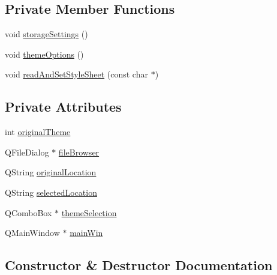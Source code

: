 \subsection*{Private Member Functions}
\begin{DoxyCompactItemize}
\item 
void \hyperlink{class_do_lah_1_1_settings_window_a198b5a222c1a612121988d86488008ba}{storage\+Settings} ()
\item 
void \hyperlink{class_do_lah_1_1_settings_window_af281a467be9f99d29e891904bd1fc239}{theme\+Options} ()
\item 
void \hyperlink{class_do_lah_1_1_settings_window_a190379578f80679445d34c3c90ce1614}{read\+And\+Set\+Style\+Sheet} (const char $\ast$)
\end{DoxyCompactItemize}
\subsection*{Private Attributes}
\begin{DoxyCompactItemize}
\item 
int \hyperlink{class_do_lah_1_1_settings_window_a923bacea5c3d17109ff6bfc0cbbaf58f}{original\+Theme}
\item 
Q\+File\+Dialog $\ast$ \hyperlink{class_do_lah_1_1_settings_window_a08d4040836467574e3ffbe85bdd3272d}{file\+Browser}
\item 
Q\+String \hyperlink{class_do_lah_1_1_settings_window_a1dcf2106d2e26c89f569e571a8fece38}{original\+Location}
\item 
Q\+String \hyperlink{class_do_lah_1_1_settings_window_a0c26a7b802888f80bf382a5f3245a1f6}{selected\+Location}
\item 
Q\+Combo\+Box $\ast$ \hyperlink{class_do_lah_1_1_settings_window_a6a18dc1bafd9e46b696584dbba064db5}{theme\+Selection}
\item 
Q\+Main\+Window $\ast$ \hyperlink{class_do_lah_1_1_settings_window_a6b6b0977f61b47a666dfbab2d861f99e}{main\+Win}
\end{DoxyCompactItemize}


\subsection{Constructor \& Destructor Documentation}
\hypertarget{class_do_lah_1_1_settings_window_aa9d32e9ffdb928d919350c22c2973468}{}
